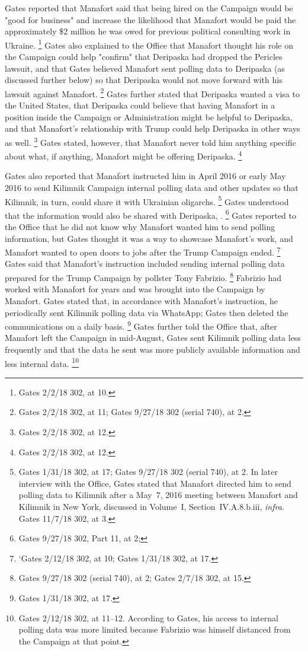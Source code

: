 Gates reported that Manafort said that being hired on the Campaign would be "good for business" and increase the likelihood that Manafort would be paid the approximately \$2 million he was owed for previous political consulting work in Ukraine.%
\footnote{Gates 2/2/18 302, at 10.}
Gates also explained to the Office that Manafort thought his role on the Campaign could help "confirm" that Deripaska had dropped the Pericles lawsuit, and that Gates believed Manafort sent polling data to Deripaska (as discussed further below) so that Deripaska would not move forward with his lawsuit against Manafort.%
\footnote{Gates 2/2/18 302, at 11;
Gates 9/27/18 302 (serial 740), at 2.}
Gates further stated that Deripaska wanted a visa to the United States, that Deripaska could believe that having Manafort in a position inside the Campaign or Administration might be helpful to Deripaska, and that Manafort's relationship with Trump could help Deripaska in other ways as well.%
\footnote{Gates 2/2/18 302, at 12.}
Gates stated, however, that Manafort never told him anything specific about what, if anything, Manafort might be offering Deripaska.%
\footnote{Gates 2/2/18 302, at 12.}

Gates also reported that Manafort instructed him in April 2016 or early May 2016 to send Kilimnik Campaign internal polling data and other updates so that Kilimnik, in turn, could share it with Ukrainian oligarchs.%
\footnote{Gates 1/31/18 302, at 17;
Gates 9/27/18 302 (serial 740), at 2.
In later interview with the Office, Gates stated that Manafort directed him to send polling data to Kilimnik after a May~7, 2016 meeting between Manafort and Kilimnik in New York, discussed in Volume~I, Section~IV.A.8.b.iii, \textit{infra}.
Gates 11/7/18 302, at 3.}
Gates understood that the information would also be shared with Deripaska,
.%
\footnote{Gates 9/27/18 302, Part 11, at 2; }
Gates reported to the Office that he did not know why Manafort wanted him to send polling information, but Gates thought it was a way to showcase Manafort's work, and Manafort wanted to open doors to jobs after the Trump Campaign ended.%
\footnote{‘Gates 2/12/18 302, at 10;
Gates 1/31/18 302, at 17.}
Gates said that Manafort's instruction included sending internal polling data prepared for the Trump Campaign by pollster Tony Fabrizio.%
\footnote{Gates 9/27/18 302 (serial 740), at 2;
Gates 2/7/18 302, at 15.}
Fabrizio had worked with Manafort for years and was brought into the Campaign by Manafort.
Gates stated that, in accordance with Manafort's instruction, he periodically sent Kilimnik polling data via WhatsApp; Gates then deleted the communications on a daily basis.%
\footnote{Gates 1/31/18 302, at 17.}
Gates further told the Office that, after Manafort left the Campaign in mid-August, Gates sent Kilimnik polling data less frequently and that the data he sent was more publicly available information and less internal data.%
\footnote{Gates 2/12/18 302, at 11--12.
According to Gates, his access to internal polling data was more limited because Fabrizio was himself distanced from the Campaign at that point.}

